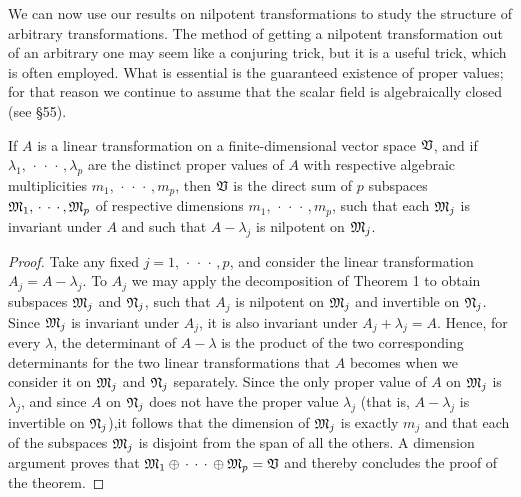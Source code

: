 We can now use our results on nilpotent transformations to study the structure
of arbitrary transformations. The method of getting a nilpotent transformation
out of an arbitrary one may seem like a conjuring trick, but it is a useful
trick, which is often employed. What is essential is the guaranteed existence of
proper values; for that reason we continue to assume that the scalar field is
algebraically closed (see §55).

\begin{theorem}
    If \(A\) is a linear transformation on a finite-dimensional vector space
    \(\mathfrak{V}\), and if \(\lambda_1, \,\cdot\,\cdot\,\cdot\,, \lambda_p\) are the
    distinct proper values of \(A\) with respective algebraic multiplicities
    \(m_1, \,\cdot\,\cdot\,\cdot\,, m_p\), then \(\mathfrak{V}\) is the direct sum of
    \(p\) subspaces \(\mathfrak{M}_1, \,\cdot\,\cdot\,\cdot\,, \mathfrak{M}_p\) of
    respective dimensions \(m_1, \,\cdot\,\cdot\,\cdot\,, m_p\), such that each
    \(\mathfrak{M}_j\) is invariant under \(A\) and such that \(A - \lambda_j\) is
    nilpotent on \(\mathfrak{M}_j\).
\end{theorem}

\begin{proof}
    Take any fixed \(j = 1, \,\cdot\,\cdot\,\cdot\,, p\), and consider the
    linear transformation \(A_j = A - \lambda_j\). To \(A_j\) we may apply the
    decomposition of Theorem 1 to obtain subspaces \(\mathfrak{M}_j\) and
    \(\frak{N}_j\), such that \(A_j\) is nilpotent on \(\mathfrak{M}_j\) and
    invertible on \(\frak{N}_j\). Since \(\mathfrak{M}_j\) is invariant under \(A_j\),
    it is also invariant under \(A_j + \lambda_j = A\). Hence, for every
    \(\lambda\), the determinant of \(A - \lambda\) is the product of the two
    corresponding determinants for the two linear transformations that \(A\)
    becomes when we consider it on \(\mathfrak{M}_j\) and \(\frak{N}_j\) separately.
    Since the only proper value of \(A\) on \(\mathfrak{M}_j\) is \(\lambda_j\), and
    since \(A\) on \(\frak{N}_j\) does not have the proper value \(\lambda_j\)
    (that is, \(A - \lambda_j\) is invertible on \(\frak{N}_j\)),it follows that
    the dimension of \(\mathfrak{M}_j\) is exactly \(m_j\) and that each of the
    subspaces \(\mathfrak{M}_j\) is disjoint from the span of all the others. A
    dimension argument proves that \(\mathfrak{M}_1 \oplus \,\cdot\,\cdot\,\cdot\,
    \oplus \mathfrak{M}_p = \mathfrak{V}\) and thereby concludes the proof of the theorem.
\end{proof}

